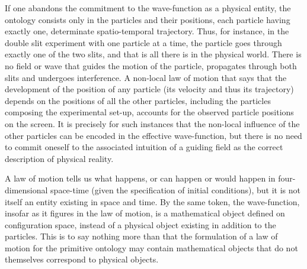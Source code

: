 \documentclass[12pt]{article}
\theoremstyle{definition}
\begin{document}
If one abandons the commitment to the wave-function as a physical entity, the ontology consists only in the particles and their positions, each particle having exactly one, determinate spatio-temporal trajectory. Thus, for instance, in the double slit experiment with one particle at a time, the particle goes through exactly one of the two slits, and that is all there is in the physical world. There is no field or wave that guides the motion of the particle, propagates through both slits and undergoes interference. A non-local law of motion that says that the development of the position of any particle (its velocity and thus its trajectory) depends on the positions of all the other particles, including the particles composing the experimental set-up, accounts for the observed particle positions on the screen. It is precisely for such instances that the non-local influence of the other particles can be encoded in the effective wave-function, but there is no need to commit oneself to the associated intuition of a guiding field as the correct description of physical reality.

A law of motion tells us what happens, or can happen or would happen in four-dimensional space-time (given the specification of initial conditions), but it is not itself an entity existing in space and time. By the same token, the wave-function, insofar as it figures in the law of motion, is a mathematical object defined on configuration space, instead of a physical object existing in addition to the particles. This is to say nothing more than that the formulation of a law of motion for the primitive ontology may contain mathematical objects that do not themselves correspond to physical objects.
\end{document}
